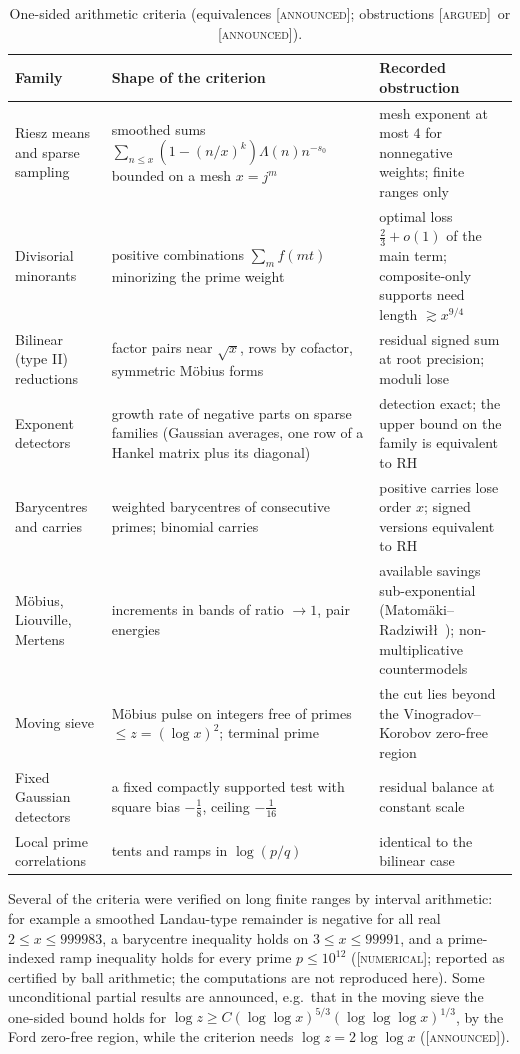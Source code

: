 \documentclass[11pt]{amsart}
\theoremstyle{definition}
\theoremstyle{remark}
\numberwithin{equation}{section}
\newcommand{\stag}[1]{\textsc{[#1]}}
\newcommand{\ARGUED}{\stag{argued}}
\newcommand{\NUM}{\stag{numerical}}
\newcommand{\ANNOUNCED}{\stag{announced}}
\begin{document}
\begin{table}[htbp]
\centering\small
\begin{tabular}{p{}p{}p{}}
\hline
Family & Shape of the criterion & Recorded obstruction\\\hline
Riesz means and sparse sampling & smoothed sums $\sum_{n\le x}(1-(n/x)^k)\Lambda(n)n^{-s_0}$ bounded on a mesh $x=j^m$ & mesh exponent at most $4$ for nonnegative weights; finite ranges only\\
Divisorial minorants & positive combinations $\sum_m f(mt)$ minorizing the prime weight & optimal loss $\frac23+o(1)$ of the main term; composite-only supports need length $\gtrsim x^{9/4}$\\
Bilinear (type II) reductions & factor pairs near $\sqrt x$, rows by cofactor, symmetric M\"obius forms & residual signed sum at root precision; moduli lose\\
Exponent detectors & growth rate of negative parts on sparse families (Gaussian averages, one row of a Hankel matrix plus its diagonal) & detection exact; the upper bound on the family is equivalent to RH\\
Barycentres and carries & weighted barycentres of consecutive primes; binomial carries & positive carries lose order $x$; signed versions equivalent to RH\\
M\"obius, Liouville, Mertens & increments in bands of ratio $\to1$, pair energies & available savings sub-exponential (Matom\"aki--Radziwi\l\l\ \cite{MatomakiRadziwill2016}); non-multiplicative countermodels\\
Moving sieve & M\"obius pulse on integers free of primes $\le z=(\log x)^2$; terminal prime & the cut lies beyond the Vinogradov--Korobov zero-free region\\
Fixed Gaussian detectors & a fixed compactly supported test with square bias $-\frac18$, ceiling $-\frac1{16}$ & residual balance at constant scale\\
Local prime correlations & tents and ramps in $\log(p/q)$ & identical to the bilinear case\\\hline
\end{tabular}
\caption{One-sided arithmetic criteria (equivalences \ANNOUNCED; obstructions \ARGUED\ or \ANNOUNCED).}\label{w7:tab:onesided}
\end{table}

Several of the criteria were verified on long finite ranges by interval arithmetic: for example a smoothed
Landau-type remainder is negative for all real $2\le x\le999983$, a barycentre inequality holds on
$3\le x\le99991$, and a prime-indexed ramp inequality holds for every prime $p\le10^{12}$ (\NUM; reported as
certified by ball arithmetic; the computations are not reproduced here). Some unconditional partial results
are announced, e.g.\ that in the moving sieve the one-sided bound holds for
$\log z\ge C(\log\log x)^{5/3}(\log\log\log x)^{1/3}$, by the Ford zero-free region, while the criterion needs
$\log z=2\log\log x$ (\ANNOUNCED).
\end{document}
